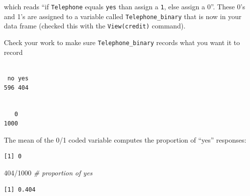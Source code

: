 \documentclass[
]{book}
\newenvironment{Shaded}{\begin{snugshade}}{\end{snugshade}}
\newcommand{\CommentTok}[1]{\textcolor[rgb]{0.56,0.35,0.01}{\textit{#1}}}
\newcommand{\DecValTok}[1]{\textcolor[rgb]{0.00,0.00,0.81}{#1}}
\newcommand{\FunctionTok}[1]{\textcolor[rgb]{0.00,0.00,0.00}{#1}}
\newcommand{\NormalTok}[1]{#1}
\newcommand{\SpecialCharTok}[1]{\textcolor[rgb]{0.00,0.00,0.00}{#1}}
\begin{document}
which reads ``if \texttt{Telephone} equals \texttt{yes} than assign a \texttt{1}, else assign a 0''. These 0's and 1's are assigned to a variable called \texttt{Telephone\_binary} that is now in your data frame (checked this with the \texttt{View(credit)} command).

Check your work to make sure \texttt{Telephone\_binary} records what you want it to record

\begin{Shaded}
\end{Shaded}

\begin{verbatim}

 no yes 
596 404 
\end{verbatim}

\begin{Shaded}
\end{Shaded}

\begin{verbatim}

   0 
1000 
\end{verbatim}

The mean of the 0/1 coded variable computes the proportion of ``yes'' responses:

\begin{Shaded}
\end{Shaded}

\begin{verbatim}
[1] 0
\end{verbatim}

\begin{Shaded}
\begin{Highlighting}[]
\DecValTok{404}\SpecialCharTok{/}\DecValTok{1000}  \CommentTok{\# proportion of yes}
\end{Highlighting}
\end{Shaded}

\begin{verbatim}
[1] 0.404
\end{verbatim}
\end{document}
